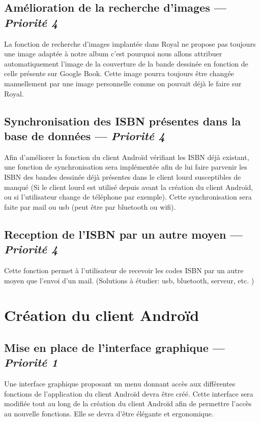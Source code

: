 \subsection[Amélioration de la recherche d'images]{Amélioration de la recherche d'images — \emph{Priorité 4}}
La fonction de recherche d'images implantée dans Royal ne propose pas toujours une image adaptée à notre album c'est pourquoi nous allons attribuer automatiquement l'image de la couverture de la bande dessinée en fonction de celle présente sur Google Book. 
Cette image pourra toujours être changée manuellement par une image personnelle comme on pouvait déjà le faire sur Royal.

\subsection[Synchronisation des ISBN présentes dans la base de données]{Synchronisation des ISBN présentes dans la base de données — \emph{Priorité 4}}
Afin d'améliorer la fonction du client Androïd vérifiant les ISBN déjà existant, une fonction de synchronisation sera implémentée afin de lui faire parvenir les ISBN des bandes dessinée déjà présentes dans le client lourd susceptibles de manqué (Si le client lourd est utilisé depuis avant la création du client Androïd, ou si l'utilisateur change de téléphone par exemple). 
Cette synchronisation sera faite par mail ou usb (peut être par bluetooth ou wifi).

\subsection[Reception de l'ISBN par un autre moyen]{Reception de l'ISBN par un autre moyen — \emph{Priorité 4}}
Cette fonction permet à l'utilisateur de recevoir les codes ISBN par un autre moyen que l'envoi d'un mail. 
(Solutions à étudier: usb, bluetooth, serveur, etc. )



\section{Création du client Androïd}


\subsection[Mise en place de l'interface graphique]{Mise en place de l'interface graphique  — \emph{Priorité 1}}
Une interface graphique proposant un menu donnant accès aux différentes fonctions de l'application du client Androïd devra être créé. 
Cette interface sera modifiée tout au long de la création du client Androïd afin de permettre l'accès au nouvelle fonctions.
Elle se devra d'être élégante et ergonomique.

